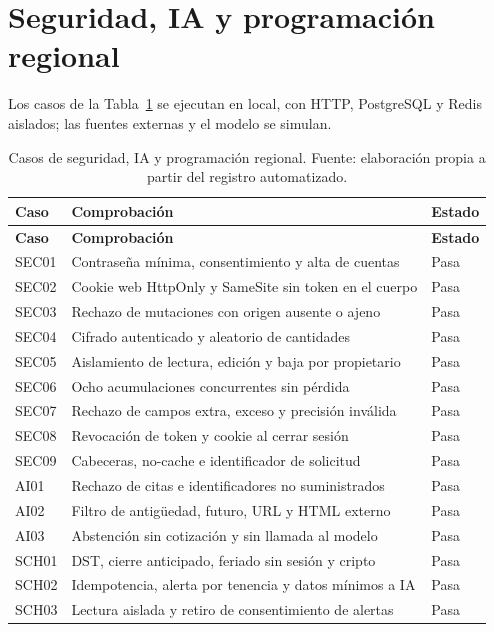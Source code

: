 \section*{Seguridad, IA y programación regional}
Los casos de la Tabla~\ref{tab:casos-seguridad} se ejecutan en local, con HTTP, PostgreSQL y Redis aislados; las fuentes externas y el modelo se simulan.
\begin{longtable}{>{\raggedright\arraybackslash}p{}>{\raggedright\arraybackslash}p{}p{}}
\caption{Casos de seguridad, IA y programación regional. Fuente: elaboración propia a partir del registro automatizado.}\label{tab:casos-seguridad}\\
\hline
\textbf{Caso} & \textbf{Comprobación} & \textbf{Estado}\\\hline\endfirsthead
\hline
\textbf{Caso} & \textbf{Comprobación} & \textbf{Estado}\\\hline\endhead
SEC01 & Contraseña mínima, consentimiento y alta de cuentas & Pasa \\\hline
SEC02 & Cookie web HttpOnly y SameSite sin token en el cuerpo & Pasa \\\hline
SEC03 & Rechazo de mutaciones con origen ausente o ajeno & Pasa \\\hline
SEC04 & Cifrado autenticado y aleatorio de cantidades & Pasa \\\hline
SEC05 & Aislamiento de lectura, edición y baja por propietario & Pasa \\\hline
SEC06 & Ocho acumulaciones concurrentes sin pérdida & Pasa \\\hline
SEC07 & Rechazo de campos extra, exceso y precisión inválida & Pasa \\\hline
SEC08 & Revocación de token y cookie al cerrar sesión & Pasa \\\hline
SEC09 & Cabeceras, no-cache e identificador de solicitud & Pasa \\\hline
AI01 & Rechazo de citas e identificadores no suministrados & Pasa \\\hline
AI02 & Filtro de antigüedad, futuro, URL y HTML externo & Pasa \\\hline
AI03 & Abstención sin cotización y sin llamada al modelo & Pasa \\\hline
SCH01 & DST, cierre anticipado, feriado sin sesión y cripto & Pasa \\\hline
SCH02 & Idempotencia, alerta por tenencia y datos mínimos a IA & Pasa \\\hline
SCH03 & Lectura aislada y retiro de consentimiento de alertas & Pasa \\\hline

\end{longtable}
